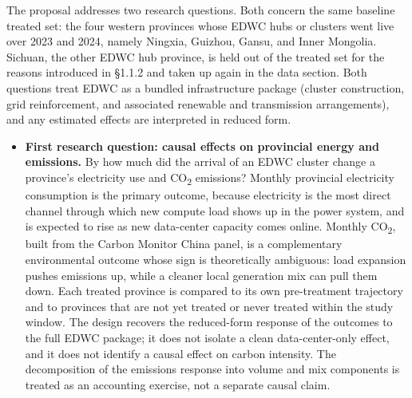 \documentclass[12pt,a4paper]{article}
\begin{document}
The proposal addresses two research questions. Both concern the same
baseline treated set: the four western provinces whose EDWC hubs or
clusters went live over 2023 and 2024, namely Ningxia, Guizhou, Gansu,
and Inner Mongolia. Sichuan, the other EDWC hub province, is held out
of the treated set for the reasons introduced in \S1.1.2 and taken up
again in the data section. Both questions treat EDWC as a bundled
infrastructure package (cluster construction, grid reinforcement, and
associated renewable and transmission arrangements), and any estimated
effects are interpreted in reduced form.

\begin{itemize}
  \item \textbf{First research question: causal effects on provincial
        energy and emissions.} By how much did the arrival of an EDWC
        cluster change a province's electricity use and
        CO\textsubscript{2} emissions? Monthly provincial electricity
        consumption is the primary outcome, because electricity is the
        most direct channel through which new compute load shows up in
        the power system, and is expected to rise as new data-center
        capacity comes online. Monthly CO\textsubscript{2}, built from
        the Carbon Monitor China panel, is a complementary
        environmental outcome whose sign is theoretically ambiguous:
        load expansion pushes emissions up, while a cleaner local
        generation mix can pull them down. Each treated province is
        compared to its own pre-treatment trajectory and to provinces
        that are not yet treated or never treated within the study
        window. The design recovers the reduced-form response of the
        outcomes to the full EDWC package; it does not isolate a
        clean data-center-only effect, and it does not identify a
        causal effect on carbon intensity. The decomposition of the
        emissions response into volume and mix components is treated
        as an accounting exercise, not a separate causal claim.


\end{itemize}
\end{document}
